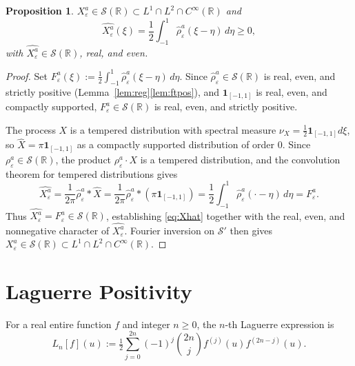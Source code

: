 \documentclass[12pt]{amsart}
\newtheorem{proposition}[theorem]{Proposition}
\theoremstyle{remark}
\begin{document}
\begin{proposition}\label{prop:Xhat}
$X_\varepsilon^a\in\mathcal{S}(\mathbb{R})\subset L^1\cap L^2\cap
C^\infty(\mathbb{R})$ and
\begin{equation}\label{eq:Xhat}
  \widehat{X_\varepsilon^a}(\xi)
  =\frac{1}{2}\int_{-1}^{1}\hat\rho_\varepsilon^a(\xi-\eta)\,d\eta
  \geq 0,
\end{equation}
with $\widehat{X_\varepsilon^a}\in\mathcal{S}(\mathbb{R})$, real, and even.
\end{proposition}

\begin{proof}
Set $F_\varepsilon^a(\xi):=\tfrac12\int_{-1}^{1}
\hat\rho_\varepsilon^a(\xi-\eta)\,d\eta$.  Since
$\hat\rho_\varepsilon^a\in\mathcal{S}(\mathbb{R})$ is real, even, and
strictly positive (Lemma~\ref{lem:reg}\ref{lem:ftpos}), and
$\mathbf{1}_{[-1,1]}$ is real, even, and compactly supported,
$F_\varepsilon^a\in\mathcal{S}(\mathbb{R})$ is real, even, and
strictly positive.

The process $X$ is a tempered distribution with spectral measure
$\nu_X=\tfrac12\mathbf{1}_{[-1,1]}d\xi$, so $\widehat{X}=
\pi\mathbf{1}_{[-1,1]}$ as a compactly supported distribution of
order $0$.  Since $\rho_\varepsilon^a\in\mathcal{S}(\mathbb{R})$,
the product $\rho_\varepsilon^a\cdot X$ is a tempered distribution,
and the convolution theorem for tempered distributions gives
\[
  \widehat{X_\varepsilon^a}
  =\frac{1}{2\pi}\hat\rho_\varepsilon^a\ast\widehat{X}
  =\frac{1}{2\pi}\hat\rho_\varepsilon^a\ast(\pi\mathbf{1}_{[-1,1]})
  =\frac{1}{2}\int_{-1}^{1}\hat\rho_\varepsilon^a(\cdot-\eta)\,d\eta
  =F_\varepsilon^a.
\]
Thus $\widehat{X_\varepsilon^a}=F_\varepsilon^a\in\mathcal{S}(\mathbb{R})$,
establishing \eqref{eq:Xhat} together with the real, even, and
nonnegative character of $\widehat{X_\varepsilon^a}$.  Fourier
inversion on $\mathcal{S}'$ then gives $X_\varepsilon^a\in
\mathcal{S}(\mathbb{R})\subset L^1\cap L^2\cap C^\infty(\mathbb{R})$.
\end{proof}

\section{Laguerre Positivity}\label{sec:laguerre}

For a real entire function $f$ and integer $n\geq 0$, the $n$-th
Laguerre expression is
\[
  L_n[f](u)
  := \tfrac12\sum_{j=0}^{2n}(-1)^j\binom{2n}{j}f^{(j)}(u)f^{(2n-j)}(u).
\]
\end{document}
